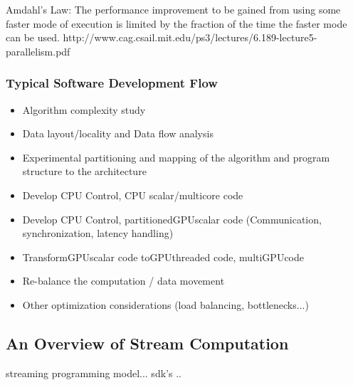 



Amdahl's Law: The performance improvement to be gained from using some faster
mode of execution is limited by the fraction of the time the faster mode can be
used.
http://www.cag.csail.mit.edu/ps3/lectures/6.189-lecture5-parallelism.pdf


\subsubsection{Typical Software Development Flow} %
\label{ssub:typical_software_development_flow}
\begin{itemize}
	\item Algorithm complexity study
	\item Data layout/locality and Data flow analysis
	\item Experimental partitioning and mapping of the algorithm and program 
		structure to the architecture
	\item Develop CPU Control, CPU scalar/multicore code
	\item Develop CPU Control, partitioned\gls{GPU}scalar code (Communication, 
		synchronization, latency handling)
	\item Transform\gls{GPU}scalar code to\gls{GPU}threaded code, multi\gls{GPU}code
	\item Re-balance the computation / data movement
	\item Other optimization considerations (load balancing, bottlenecks...)
\end{itemize}


\subsection{An Overview of Stream Computation} %
\label{sub:an_overview_of_stream_computation}
streaming programming model... sdk's .. 

